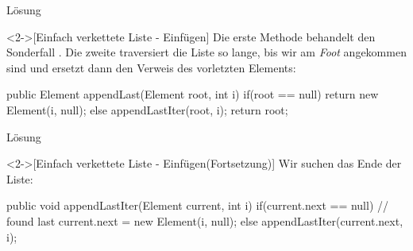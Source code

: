 \begin{frame}[fragile,c]{Lösung}
    \begin{solve}<2->[Einfach verkettete Liste - Einfügen]
        Die erste Methode behandelt den Sonderfall . Die zweite traversiert die Liste so lange,\pause{} bis wir am \emph{Foot} angekommen sind und ersetzt dann den Verweis des vorletzten Elements:\pause{}
\begin{plainjava}
public Element appendLast(Element root, int i) {
    if(root == null) {
        return new Element(i, null);
    } else {
        appendLastIter(root, i);
        return root;
    }
}
\end{plainjava}
    \end{solve}
\end{frame}

\begin{frame}[fragile,c]{Lösung}
    \addtocounter{solve}{-1}%
    \begin{solve}<2->[Einfach verkettete Liste - Einfügen\hfill{}(Fortsetzung)]
        Wir suchen das Ende der Liste:
\begin{plainjava}
public void appendLastIter(Element current, int i){
    if(current.next == null) // found last
        current.next = new Element(i, null);
    else
        appendLastIter(current.next, i);
}
\end{plainjava}
    \end{solve}
\end{frame}
\fi

\def\Element#1{{\renewcommand{\arraystretch}{1.4}%
    \begin{tabular}{|p{1em}|>{\centering}p{1em}|p{1em}|}
        \hline
            & \strut#1 & \\
        \hline
    \end{tabular}%
}}


